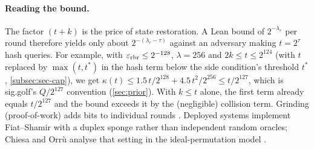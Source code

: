 \paragraph{Reading the bound.} The factor $(t+k)$ is the price of state restoration. A Lean bound
of $2^{-\lambda_r}$ per round therefore yields only about $2^{-(\lambda_r-\tau)}$ against an
adversary making $t=2^\tau$ hash queries. For example, with
$\varepsilon_{\mathrm{rbr}}\le 2^{-128}$, $\lambda=256$ and $2k\le t\le 2^{124}$ (with $t$ replaced by
$\max(t,t^*)$ in the hash term below the side condition's threshold $t^*$, \cref{subsec:sec-cap}),
we get $\kappa(t)\le 1.5\,t/2^{128}+4.5\,t^2/2^{256}\le t/2^{127}$, which is sig.golf's $Q/2^{127}$
convention (\cref{sec:prior}). With $k\le t$ alone, the first term already equals $t/2^{127}$ and
the bound exceeds it by the (negligible) collision term. Grinding (proof-of-work) adds bits to
individual rounds \cite{ethSTARK21}. Deployed systems implement
Fiat--Shamir with a duplex sponge rather than independent random oracles; Chiesa and Orr\`u
analyse that setting in the ideal-permutation model \cite{CO25-DuplexFS}.

